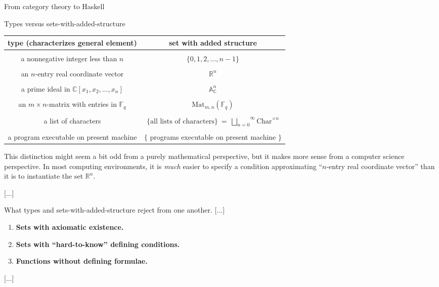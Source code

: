 \documentclass[11pt, a4paper]{article}
\begin{document}
\begin{section}{From category theory to Haskell}
\begin{subsection}{Types versus sets-with-added-structure}
\begin{center}
\begin{tabular}{c|c}
{\bf type} {\small (characterizes general element)} & {\bf set with added structure}
\\[4pt]
\hline\hline
\\[-10pt]
a nonnegative integer less than $n$ & $\{0,1,2,\dots,n-1\}$
\\[4pt]
\hline
\\[-10pt]
an $n$-entry real coordinate vector
&
$\mathbb{R}^n$
\\[4pt]
\hline
\\[-10pt]
a prime ideal in $\mathbb{C}[x_1,x_2,\dots,x_n]$
&
$\mathbb{A}^{\!n}_{\mathbb{C}}$
\\[4pt]
\hline
\\[-10pt]
an $m\!\times\!n$-matrix with entries in $\mathbb{F}_{\!q}$
&
$\text{Mat}_{m,n}(\mathbb{F}_{\!q})$
\\[4pt]
\hline
\\[-10pt]
a list of characters
&
$\{\text{all lists of characters}\}\ =\ \overset{\infty}{\underset{n=0}{\bigsqcup}}\text{Char}^{\times n}$
\\[4pt]
\hline
\\[-10pt]
a program executable on present machine
&
$\{\!$
programs executable on present machine
$\!\}$
\\[4pt]
\end{tabular}

\end{center}

\noindent
This distinction might seem a bit odd from a purely mathematical perspective, but it makes more sense from a computer science perspective. In most computing environments, it is {\em much} easier to specify a condition approximating ``$n$-entry real coordinate vector'' than it is to instantiate the set $\mathbb{R}^{n}$.

[...]

\begin{subsubsection}{What types and sets-with-added-structure reject from one another.}
[...]

\begin{enumerate}
\item
{\bf Sets with axiomatic existence.}
\item
{\bf Sets with ``hard-to-know'' defining conditions.}
\item
{\bf Functions without defining formulae.}
\end{enumerate}

[...]


\end{subsubsection}
\end{subsection}
\end{section}
\end{document}
